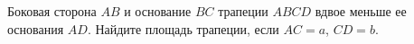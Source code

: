 \begin{ex}
	\begin{condition}
		Боковая сторона \( AB  \) и основание \( BC  \) трапеции \( ABCD  \) вдвое меньше ее основания \( AD \). Найдите площадь трапеции, если \( AC = a \), \( CD = b \).
	\end{condition}
\end{ex}